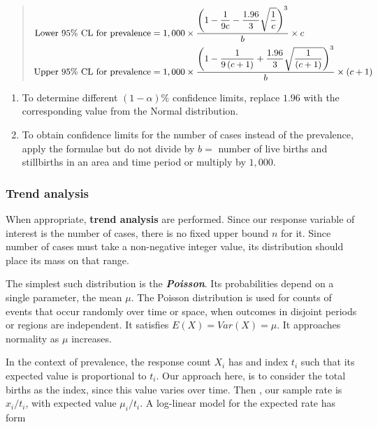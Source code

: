 \documentclass[
]{krantz}
\providecommand{\tightlist}{%
  \setlength{\itemsep}{0pt}\setlength{\parskip}{0pt}}
\begin{document}
\begin{quote}
\[
\small
\begin{aligned}
\text{Lower } 95\% \text{ CL for prevalence} &= 1,000 \times \dfrac{\left( 1- \dfrac{1}{9c}-\dfrac{1.96}{3}\sqrt{\dfrac{1}{c}} \right)^{3}}{b}\times c  \\
\text{Upper } 95\% \text{ CL for prevalence} &= 1,000 \times \dfrac{\left( 1- \dfrac{1}{9\left(c+1\right)}+\dfrac{1.96}{3}\sqrt{\dfrac{1}{\left(c+1\right)}} \right)^{3}}{b}\times \left(c+1\right) 
\end{aligned}
\]
\end{quote}

\begin{enumerate}
\def\labelenumi{\arabic{enumi}.}
\setcounter{enumi}{1}
\tightlist
\item
  To determine different \(\left(1 - \alpha \right) \%\) confidence limits, replace \(1.96\) with the corresponding value from the Normal distribution.
\item
  To obtain confidence limits for the number of cases instead of the prevalence, apply the formulae but do not divide by \(b=\) number of live births and stillbirths in an area and time period or multiply by \(1,000\).
\end{enumerate}

\hypertarget{trend-analysis}{%
\subsubsection*{Trend analysis}\label{trend-analysis}}


When appropriate, \textbf{trend analysis} are performed. Since our response variable of interest is the number of cases, there is no fixed upper bound \(n\) for it. Since number of cases must take a non-negative integer value, its distribution should place its mass on that range.

The simplest such distribution is the \textbf{\emph{Poisson}}. Its probabilities depend on a single parameter, the mean \(\mu\). The Poisson distribution is used for counts of events that occur randomly over time or space, when outcomes in disjoint periods or regions are independent. It satisfies \(E\left(X\right)=Var\left(X\right)=\mu\). It approaches normality as \(\mu\) increases.

In the context of prevalence, the response count \(X_{i}\) has and index \(t_{i}\) such that its expected value is proportional to \(t_{i}\). Our approach here, is to consider the total births as the index, since this value varies over time. Then , our sample rate is \(x_{i}/t_{i}\), with expected value \(\mu_{i}/t_{i}\). A log-linear model for the expected rate has form
\end{document}
